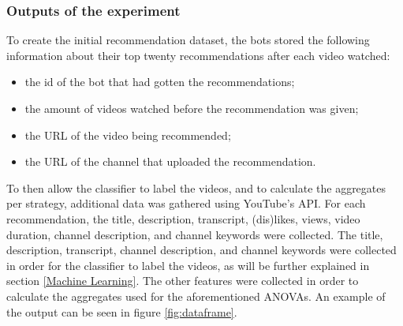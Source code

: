 \documentclass[../main.tex]{subfiles}
\begin{document}
\subsubsection{Outputs of the experiment}
To create the initial recommendation dataset, the bots stored the following information about their top 
twenty recommendations after each video watched: 
\begin{itemize}
    \item the id of the bot that had gotten the recommendations;
    \item the amount of videos watched before the recommendation was given;
    \item the URL of the video being recommended;
    \item the URL of the channel that uploaded the recommendation.
\end{itemize}
To then allow the classifier to label the videos, and to calculate the aggregates per strategy, additional 
data was gathered using YouTube's API. For each recommendation, the title, description, transcript, 
(dis)likes, views, video duration, channel description, and channel keywords were collected. The title, 
description, transcript, channel description, and channel keywords were collected in order for the 
classifier to label the videos, as will be further explained in section \ref{Machine Learning}. The other 
features were collected in order to calculate the aggregates used for the aforementioned ANOVAs. An example
of the output can be seen in figure \ref{fig:dataframe}.
\end{document}
